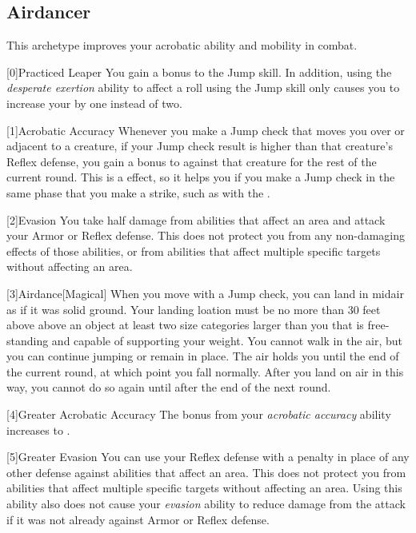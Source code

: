     \newpage
    \subsection{Airdancer}\label{Airdancer}
        This archetype improves your acrobatic ability and mobility in combat.

        [0]{Practiced Leaper} You gain a  bonus to the Jump skill.
        In addition, using the \textit{desperate exertion} ability to affect a roll using the Jump skill only causes you to increase your  by one instead of two.

        [1]{Acrobatic Accuracy} Whenever you make a Jump check that moves you over or adjacent to a creature, if your Jump check result is higher than that creature's Reflex defense, you gain a  bonus to  against that creature for the rest of the current round.
        This is a  effect, so it helps you if you make a Jump check in the same phase that you make a strike, such as with the  .

        [2]{Evasion} You take half damage from abilities that affect an area and attack your Armor or Reflex defense.
        This does not protect you from any non-damaging effects of those abilities, or from abilities that affect multiple specific targets without affecting an area.

        [3]{Airdance}[Magical] When you move with a Jump check, you can land in midair as if it was solid ground.
        Your landing loation must be no more than 30 feet above above an object at least two size categories larger than you that is free-standing and capable of supporting your weight.
        You cannot walk in the air, but you can continue jumping or remain in place.
        The air holds you until the end of the current round, at which point you fall normally.
        After you land on air in this way, you cannot do so again until after the end of the next round.

        [4]{Greater Acrobatic Accuracy} The bonus from your \textit{acrobatic accuracy} ability increases to .

        [5]{Greater Evasion} You can use your Reflex defense with a  penalty in place of any other defense against abilities that affect an area.
        This does not protect you from abilities that affect multiple specific targets without affecting an area.
        Using this ability also does not cause your \textit{evasion} ability to reduce damage from the attack if it was not already against Armor or Reflex defense.

